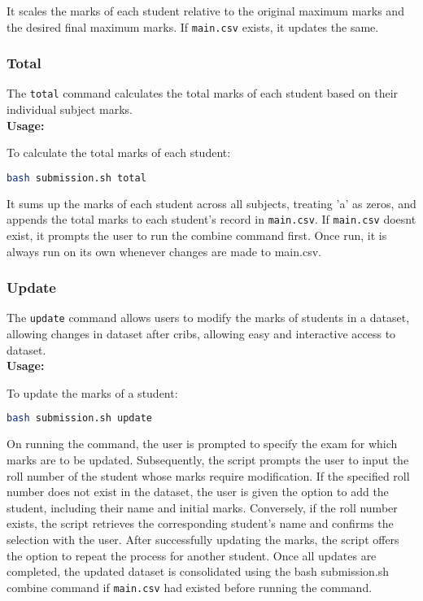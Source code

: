 \documentclass{article}
\begin{document}
It scales the marks of each student relative to the original maximum marks and the desired final maximum marks. If \texttt{main.csv} exists, it updates the same.

\subsubsection{Total}
The \texttt{total} command calculates the total marks of each student based on their individual subject marks.\\
\textbf{Usage:}
\begin{adjustwidth}{0.5cm}{0cm}
To calculate the total marks of each student:
\begin{lstlisting}[language=bash]
bash submission.sh total
\end{lstlisting}
\end{adjustwidth}

It sums up the marks of each student across all subjects, treating 'a' as zeros, and appends the total marks to each student's record in \texttt{main.csv}. If \texttt{main.csv} doesnt exist, it prompts the user to run the combine command first. Once run, it is always run on its own whenever changes are made to main.csv.

\subsubsection{Update}
The \texttt{update} command allows users to modify the marks of students in a dataset, allowing changes in dataset after cribs, allowing easy and interactive access to dataset.\\
\textbf{Usage:}
\begin{adjustwidth}{0.5cm}{0cm}
To update the marks of a student:
\begin{lstlisting}[language=bash]
bash submission.sh update
\end{lstlisting}
\end{adjustwidth}

On running the command, the user is prompted to specify the exam for which marks are to be updated. Subsequently, the script prompts the user to input the roll number of the student whose marks require modification. If the specified roll number does not exist in the dataset, the user is given the option to add the student, including their name and initial marks. Conversely, if the roll number exists, the script retrieves the corresponding student's name and confirms the selection with the user. After successfully updating the marks, the script offers the option to repeat the process for another student. Once all updates are completed, the updated dataset is consolidated using the bash submission.sh combine command if \texttt{main.csv} had existed before running the command.
\end{document}
